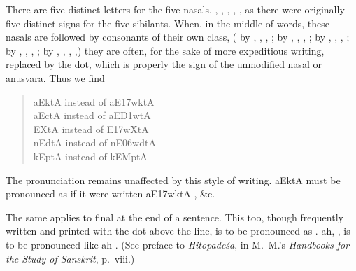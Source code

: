 \s There are five distinct letters for the five nasals, {\dn {}} ,
{\dn {}} , {\dn {}} , {\dn {}} , {\dn {}} , as there were
originally five distinct signs for the five sibilants. When, in the
middle of words, these nasals are followed by consonants of their own
class, ( by , , , ;  by ,
, , ;  by , , , ;
 by , , , ;  by , ,
, ,) they are often, for the sake of more expeditious
writing, replaced by the dot, which is properly the sign of the
unmodified nasal or anusvāra. Thus we find

\begin{quote}
  {\dn a\2EktA} instead of {\dn aE\317wktA} \\
  {\dn a\2EctA} instead of {\dn aE\3D1wtA} \\
  {\dn {}\2EXtA} instead of {\dn {}E\317wXtA} \\
  {\dn n\2EdtA} instead of {\dn nE\306wdtA} \\
  {\dn k\2EptA} instead of {\dn kEMptA} \\
\end{quote}

The pronunciation remains unaffected by this style of writing.
{\dn a\2EktA} must be pronounced as if it were written {\dn aE\317wktA}
, \&c.

The same applies to final {\dn {}}  at the end of a sentence. This
too, though frequently written and printed with the dot above the line,
is to be pronounced as . {\dn ah\2}, , is to be pronounced
like {\dn ah} . (See preface to \emph{Hitopadeśa}, in M.\ M.'s
\emph{Handbooks for the Study of Sanskrit}, p.\ viii.)


